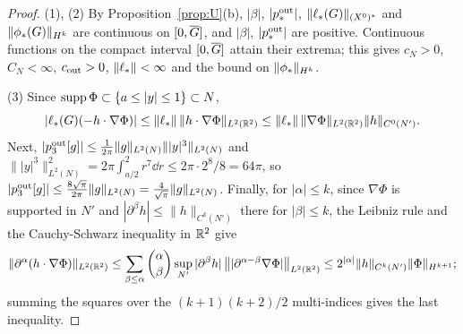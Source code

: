 \begin{proof}
(1), (2) By Proposition~\ref{prop:U}(b), $|\beta|$, $|p^{\mathrm{out}}_*|$, $\|\ell_*(G)\|_{(X^0)^*}$ and
$\|\phi_*(G)\|_{H^k}$ are continuous on $[0,\overline{G}]$, and $|\beta|$, $|p^{\mathrm{out}}_*|$ are
positive. Continuous functions on the compact interval $[0,\overline{G}]$ attain their
extrema; this gives $c_N>0$, $C_N<\infty$, $c_{\mathrm{out}}>0$, $\|\ell_*\|<\infty$ and the
bound on $\|\phi_*\|_{H^k}$.

(3) Since $\operatorname{supp}\Phi\subset\{a\le|y|\le1\}\subset N$,
\[
|\ell_*(G)(-h\cdot\nabla\Phi)|\le\|\ell_*\|\,\|h\cdot\nabla\Phi\|_{L^2(\mathbb{R}^2)}
\le\|\ell_*\|\,\|\nabla\Phi\|_{L^2(\mathbb{R}^2)}\|h\|_{C^0(N')} .
\]
Next, $|p^{\mathrm{out}}_3[g]|\le\frac1{2\pi}\|g\|_{L^2(N)}\||y|^3\|_{L^2(N)}$ and
$\||y|^3\|^2_{L^2(N)}=2\pi\int_{a/2}^2r^7\dd r\le2\pi\cdot2^8/8=64\pi$, so
$|p^{\mathrm{out}}_3[g]|\le\frac{8\sqrt\pi}{2\pi}\|g\|_{L^2(N)}=\frac4{\sqrt\pi}\|g\|_{L^2(N)}$.
Finally, for $|\alpha|\le k$, since $\nabla\Phi$ is supported in $N'$ and
$|\partial^\beta h|\le\|h\|_{C^k(N')}$ there for $|\beta|\le k$, the Leibniz rule
and the Cauchy-Schwarz inequality in $\mathbb{R}^2$ give
\[
\|\partial^\alpha(h\cdot\nabla\Phi)\|_{L^2(\mathbb{R}^2)}\le\sum_{\beta\le\alpha}\binom\alpha\beta
\sup_{N'}|\partial^\beta h|\,\big\||\partial^{\alpha-\beta}\nabla\Phi|\big\|_{L^2(\mathbb{R}^2)}
\le2^{|\alpha|}\|h\|_{C^k(N')}\|\Phi\|_{H^{k+1}};
\]
summing the squares over the $(k+1)(k+2)/2$ multi-indices gives the last inequality.
\end{proof}

